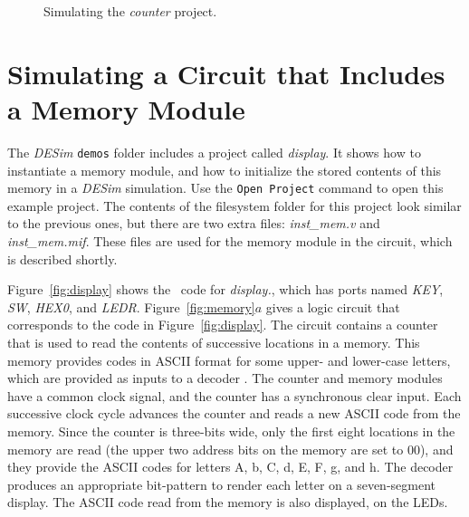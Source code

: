 {\begin{figure}[h]
\begin{center}
        \fi
	\end{center}
          \caption{Simulating the {\it counter} project.}
	\label{fig:sim2}
\end{figure}

\section{Simulating a Circuit that Includes a Memory Module}

The {\it DESim} \texttt{demos} folder includes a project called {\it display}. It shows how 
to instantiate a memory module, and how to initialize the stored contents of 
this memory in a {\it DESim} simulation.  Use the \texttt{Open Project} command to open this
example project. The contents of the filesystem folder for this project look similar to the 
previous ones, but there are two extra files: {\it inst\_mem.v} and {\it inst\_mem.mif}. These 
files are used for the memory module in the circuit, which is described shortly.

Figure~\ref{fig:display} shows the \hdlName~code for {\it display.\hdlFileExt}, which 
has ports named {\it KEY}, {\it SW}, {\it HEX0}, and {\it LEDR}.
Figure~\ref{fig:memory}$a$ gives a logic circuit that corresponds to the code in 
Figure~\ref{fig:display}. The circuit contains a counter that is used to read the 
contents of successive locations in a memory. This memory provides codes in ASCII format 
for some upper- and lower-case letters, which are provided as inputs to a decoder \hdlModuleName. 
The counter and memory modules have a common clock signal, and the counter has a
synchronous clear input. Each successive clock cycle advances the counter and reads 
a new ASCII code from the memory. Since the counter is three-bits wide, only the first 
eight locations in the memory are read (the upper two address bits on the memory are set
to 00), and they provide the ASCII codes for letters A, b, C, d, E, F, g, and h. The 
decoder produces an appropriate bit-pattern to render each letter on a seven-segment display.
The ASCII code read from the memory is also displayed, on the LEDs.

}
